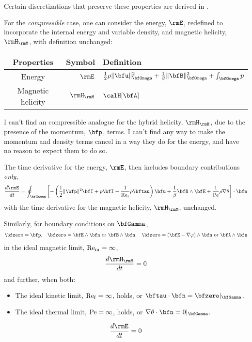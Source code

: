     Certain discretizations that preserve these properties are derived in \cite{Laakmann_Hu_Farrell_2022}.

    For the \emph{compressible} case, one can consider the energy, $\rmE$, redefined to incorporate the internal energy and variable density, and magnetic helicity, $\rmH_{\rmM}$, with definition unchanged:
    \begin{center}\begin{tabular}{ c | r l }
        Properties  &  Symbol  &  Definition  \\
        \hline\hline
        Energy  &  $\rmE$  &  $\frac{1}{2}\rho\|\bfu\|_{\bfOmega}^{2} + \frac{1}{\beta}\|\bfB\|_{\bfOmega}^{2} + \int_{\bfOmega}p$  \\
        Magnetic helicity  &  $\rmH_{\rmM}$  &  $\calH[\bfA]$
    \end{tabular}\end{center}
    \begin{remark}
        I can't find an compressible analogue for the hybrid helicity, $\rmH_{\rmH}$, due to the presence of the momentum, $\bfp$, terms. I can't find any way to make the momentum and density terms cancel in a way they do for the energy, and have no reason to expect them to do so.
    \end{remark}
    The time derivative for the energy, $\rmE$, then includes boundary contributions \emph{only}, 
    \begin{equation}
        \frac{d\rmE}{dt}  =  \oint_{\bfGamma}\left[- \left(\frac{1}{2}\|\bfp\|^{2}\bfI + p\bfI - \frac{1}{\rmRef}\rho\bftau\right)\bfu + \frac{1}{\beta}\bfB\wedge\bfE + \frac{1}{\rmPe}\rho\nabla\theta\right]\cdot\bfn
    \end{equation}
    with the time derivative for the magnetic helicity, $\rmH_{\rmM}$, unchanged.

    Similarly, for boundary conditions on $\bfGamma$,
    \begin{align}\label{eqn:compressible canonical boundary conditions}
        \bfzero  =  \bfp,  &&
        \bfzero  =  \bfE\wedge\bfn \text{ or } \bfB\wedge\bfn,  &&
        \bfzero  =  (\bfE - \nabla\varphi)\wedge\bfn \text{ or } \bfA\wedge\bfn
    \end{align}
    in the ideal magnetic limit, $\mathrm{Re}_{\mathrm{m}}  =  \infty$, 
    \begin{equation}
        \frac{d\rmH_{\rmM}}{dt}  =  0
    \end{equation}
    and further, when both:
    \begin{itemize}
        \item  The ideal kinetic limit, $\mathrm{Re}_{\mathrm{f}}  =  \infty$, holds, or $\bftau\cdot\bfn  =  \bfzero|_{\bfGamma}$.
        \item  The ideal thermal limit, $\mathrm{Pe}  =  \infty$, holds, or $\nabla\theta\cdot\bfn  =  0|_{\bfGamma}$.
    \end{itemize}
    \begin{equation}
        \frac{d\rmE}{dt}  =  0
    \end{equation}

